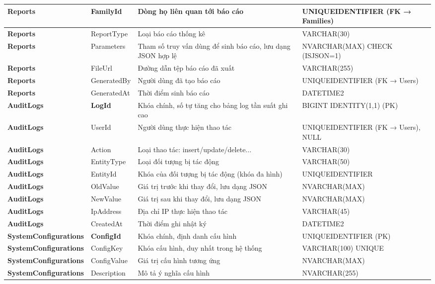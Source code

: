 \begin{longtable}{|p{}|p{}|p{}|p{}|}
\textbf{Reports} & FamilyId & Dòng họ liên quan tới báo cáo & UNIQUEIDENTIFIER (FK → Families) \\ \hline
\textbf{Reports} & ReportType & Loại báo cáo thống kê & VARCHAR(30) \\ \hline
\textbf{Reports} & Parameters & Tham số truy vấn dùng để sinh báo cáo, lưu dạng JSON hợp lệ & NVARCHAR(MAX) CHECK (ISJSON=1) \\ \hline
\textbf{Reports} & FileUrl & Đường dẫn tệp báo cáo đã xuất & VARCHAR(255) \\ \hline
\textbf{Reports} & GeneratedBy & Người dùng đã tạo báo cáo & UNIQUEIDENTIFIER (FK → Users) \\ \hline
\textbf{Reports} & GeneratedAt & Thời điểm sinh báo cáo & DATETIME2 \\ \hline
\textbf{AuditLogs} & \textbf{LogId} & Khóa chính, số tự tăng cho bảng log tần suất ghi cao & BIGINT IDENTITY(1,1) (PK) \\ \hline
\textbf{AuditLogs} & UserId & Người dùng thực hiện thao tác & UNIQUEIDENTIFIER (FK → Users), NULL \\ \hline
\textbf{AuditLogs} & Action & Loại thao tác: insert/update/delete... & VARCHAR(30) \\ \hline
\textbf{AuditLogs} & EntityType & Loại đối tượng bị tác động & VARCHAR(50) \\ \hline
\textbf{AuditLogs} & EntityId & Khóa của đối tượng bị tác động (khóa đa hình) & UNIQUEIDENTIFIER \\ \hline
\textbf{AuditLogs} & OldValue & Giá trị trước khi thay đổi, lưu dạng JSON & NVARCHAR(MAX) \\ \hline
\textbf{AuditLogs} & NewValue & Giá trị sau khi thay đổi, lưu dạng JSON & NVARCHAR(MAX) \\ \hline
\textbf{AuditLogs} & IpAddress & Địa chỉ IP thực hiện thao tác & VARCHAR(45) \\ \hline
\textbf{AuditLogs} & CreatedAt & Thời điểm ghi nhật ký & DATETIME2 \\ \hline
\textbf{SystemConfigurations} & \textbf{ConfigId} & Khóa chính, định danh cấu hình & UNIQUEIDENTIFIER (PK) \\ \hline
\textbf{SystemConfigurations} & ConfigKey & Khóa cấu hình, duy nhất trong hệ thống & VARCHAR(100) UNIQUE \\ \hline
\textbf{SystemConfigurations} & ConfigValue & Giá trị cấu hình tương ứng & NVARCHAR(MAX) \\ \hline
\textbf{SystemConfigurations} & Description & Mô tả ý nghĩa cấu hình & NVARCHAR(255) \\ \hline

\end{longtable}
